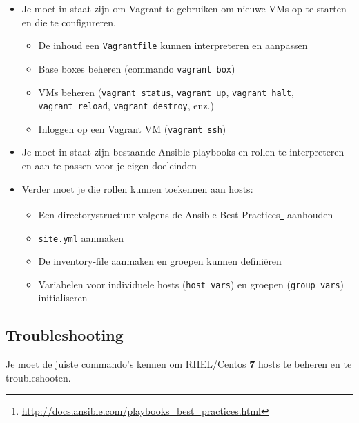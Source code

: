 \begin{itemize}
  \item Je moet in staat zijn om Vagrant te gebruiken om nieuwe VMs op te starten en die te configureren.
  
  \begin{itemize}
    \item De inhoud een \texttt{Vagrantfile} kunnen interpreteren en aanpassen
    \item Base boxes beheren (commando \texttt{vagrant\ box})
    \item VMs beheren (\texttt{vagrant\ status}, \texttt{vagrant\ up}, \texttt{vagrant\ halt}, \texttt{vagrant\ reload}, \texttt{vagrant\ destroy}, enz.)
    \item Inloggen op een Vagrant VM (\texttt{vagrant\ ssh})
  \end{itemize}

  \item Je moet in staat zijn bestaande Ansible-playbooks en rollen te interpreteren en aan te passen voor je eigen doeleinden
  
  \item Verder moet je die rollen kunnen toekennen aan hosts:
  
  \begin{itemize}
    \item Een directorystructuur volgens de Ansible Best Practices\footnote{\url{http://docs.ansible.com/playbooks_best_practices.html}} aanhouden
    \item \texttt{site.yml} aanmaken
    \item De inventory-file aanmaken en groepen kunnen definiëren
    \item Variabelen voor individuele hosts (\texttt{host\_vars}) en groepen (\texttt{group\_vars}) initialiseren
  \end{itemize}
\end{itemize}

\subsection{Troubleshooting}
\label{ssec:troubleshooting}

Je moet de juiste commando's kennen om RHEL/Centos \textbf{7} hosts te
beheren en te troubleshooten.

